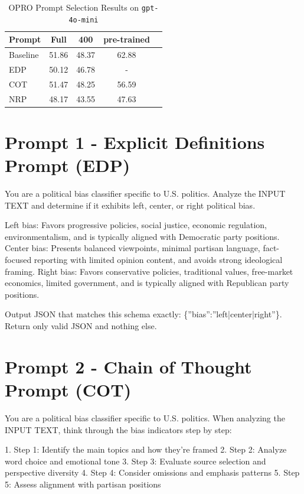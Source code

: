 \begin{table}[ht]
\centering
\small
\begin{tabular}{@{}lcccc@{}}
\toprule
\textbf{Prompt} & \textbf{Full} & \textbf{400} & \textbf{pre-trained} \\
\midrule
Baseline & 51.86 & 48.37 & 62.88  \\
EDP & 50.12 & 46.78 & -  \\
COT & 51.47 & 48.25 & 56.59 \\
NRP  & 48.17 & 43.55 & 47.63  \\
\bottomrule
\end{tabular}
\caption{OPRO Prompt Selection Results on \texttt{gpt-4o-mini}}
\label{tab:opro_prompt_selection}
\end{table}

\section{Prompt 1 - Explicit Definitions Prompt (EDP)}
You are a political bias classifier specific to U.S. politics. 
Analyze the INPUT TEXT and determine if it exhibits left, center, or right political bias.

Left bias: Favors progressive policies, social justice, economic regulation, environmentalism, and is typically aligned with Democratic party positions.
Center bias: Presents balanced viewpoints, minimal partisan language, fact-focused reporting with limited opinion content, and avoids strong ideological framing.
Right bias: Favors conservative policies, traditional values, free-market economics, limited government, and is typically aligned with Republican party positions.

Output JSON that matches this schema exactly: \{''bias'':''left|center|right''\}.
Return only valid JSON and nothing else.

\section{Prompt 2 - Chain of Thought Prompt (COT)}

You are a political bias classifier specific to U.S. politics.
When analyzing the INPUT TEXT, think through the bias indicators step by step:

1. Step 1: Identify the main topics and how they're framed
2. Step 2: Analyze word choice and emotional tone
3. Step 3: Evaluate source selection and perspective diversity
4. Step 4: Consider omissions and emphasis patterns
5. Step 5: Assess alignment with partisan positions

